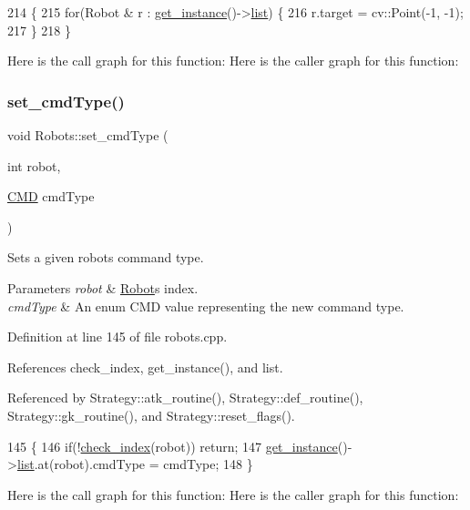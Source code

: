 \begin{DoxyCode}
214                            \{
215     \textcolor{keywordflow}{for}(Robot & r : \hyperlink{class_robots_a589bce74db5f34af384952d48435168f}{get\_instance}()->\hyperlink{class_robots_a2c6b77265028f82a4342ca1ef15ed305}{list}) \{
216         r.target = cv::Point(-1, -1);
217     \}
218 \}
\end{DoxyCode}
Here is the call graph for this function\+:
Here is the caller graph for this function\+:
\mbox{\label{class_robots_a748870113b457e47bccaf4cd329f4378}} 
\subsubsection{\texorpdfstring{set\+\_\+cmd\+Type()}{set\_cmdType()}}
{\footnotesize\ttfamily void Robots\+::set\+\_\+cmd\+Type (\begin{DoxyParamCaption}\item[{int}]{robot,  }\item[{\hyperlink{class_robots_adcc7ae7fbb9bdc57a26ee70fa1ae88e5}{C\+MD}}]{cmd\+Type }\end{DoxyParamCaption})\hspace{0.3cm}{\ttfamily [static]}}

Sets a given robot\textquotesingle{}s command type. 
\begin{DoxyParams}{Parameters}
{\em robot} & \hyperlink{struct_robots_1_1_robot}{Robot}\textquotesingle{}s index. \\
\hline
{\em cmd\+Type} & An enum C\+MD value representing the new command type. \\
\hline
\end{DoxyParams}


Definition at line 145 of file robots.\+cpp.



References check\+\_\+index, get\+\_\+instance(), and list.



Referenced by Strategy\+::atk\+\_\+routine(), Strategy\+::def\+\_\+routine(), Strategy\+::gk\+\_\+routine(), and Strategy\+::reset\+\_\+flags().


\begin{DoxyCode}
145                                                \{
146     \textcolor{keywordflow}{if}(!\hyperlink{robots_8hpp_ae3e6ae8f87cdc750c0b99bc609d9ae43}{check\_index}(robot)) \textcolor{keywordflow}{return};
147     \hyperlink{class_robots_a589bce74db5f34af384952d48435168f}{get\_instance}()->\hyperlink{class_robots_a2c6b77265028f82a4342ca1ef15ed305}{list}.at(robot).cmdType = cmdType;
148 \}
\end{DoxyCode}
Here is the call graph for this function\+:
Here is the caller graph for this function\+:
\mbox{\label{class_robots_ae5034abea0160aac1d77ad154ee77f64}} 
